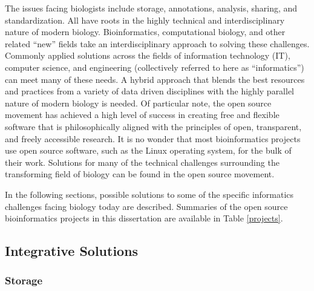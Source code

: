 The issues facing biologists include storage, annotations, analysis, sharing, and
standardization.  All have roots in the highly technical and interdisciplinary
nature of modern biology.  Bioinformatics, computational biology, and other
related ``new'' fields take an interdisciplinary approach to solving these
challenges.  Commonly applied solutions across the fields of information
technology (IT), computer science, and engineering (collectively referred to
here as ``informatics'') can meet many of these needs.  A hybrid
approach that blends the best resources and practices from a variety
of data driven disciplines with the highly parallel nature of modern biology is needed.
Of particular note, the open source movement has achieved a high level of
success in creating free and flexible software that is philosophically aligned
with the principles of open, transparent, and freely accessible research.  It
is no wonder that most bioinformatics projects use open source software, such
as the Linux operating system, for the bulk of their work.  Solutions for many
of the technical challenges surrounding the transforming field of biology can
be found in the open source movement.

In the following sections, possible solutions to some of the specific informatics
challenges facing biology today are described. Summaries of the open source
bioinformatics projects in this dissertation are available in Table \ref{projects}.


\subsection{Integrative Solutions}

\subsubsection{Storage}

